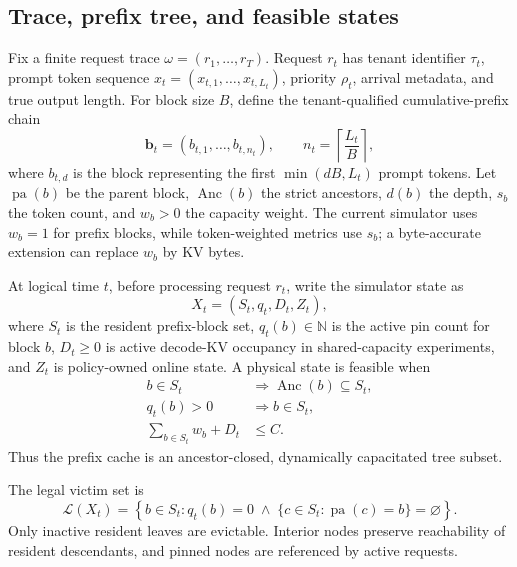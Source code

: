 \documentclass[11pt]{article}
\begin{document}
\subsection{Trace, prefix tree, and feasible states}

Fix a finite request trace \(\omega=(r_1,\ldots,r_T)\).  Request \(r_t\) has tenant
identifier \(\tau_t\), prompt token sequence
\(x_t=(x_{t,1},\ldots,x_{t,L_t})\), priority \(\rho_t\), arrival metadata, and true
output length.  For block size \(B\), define the tenant-qualified cumulative-prefix
chain
\begin{equation}
  \mathbf b_t=(b_{t,1},\ldots,b_{t,n_t}),
  \qquad
  n_t=\left\lceil \frac{L_t}{B}\right\rceil,
\end{equation}
where \(b_{t,d}\) is the block representing the first \(\min(dB,L_t)\) prompt tokens.
Let \(\operatorname{pa}(b)\) be the parent block, \(\operatorname{Anc}(b)\) the strict
ancestors, \(d(b)\) the depth, \(s_b\) the token count, and \(w_b>0\) the capacity
weight.  The current simulator uses \(w_b=1\) for prefix blocks, while token-weighted
metrics use \(s_b\); a byte-accurate extension can replace \(w_b\) by KV bytes.

At logical time \(t\), before processing request \(r_t\), write the simulator state as
\begin{equation}
  X_t=(S_t,q_t,D_t,Z_t),
\end{equation}
where \(S_t\) is the resident prefix-block set, \(q_t(b)\in\mathbb N\) is the active
pin count for block \(b\), \(D_t\ge 0\) is active decode-KV occupancy in shared-capacity
experiments, and \(Z_t\) is policy-owned online state.  A physical state is feasible
when
\begin{align}
  b\in S_t &\Longrightarrow \operatorname{Anc}(b)\subseteq S_t,
  \label{eq:prefix-closure-regime}\\
  q_t(b)>0 &\Longrightarrow b\in S_t,
  \label{eq:pins-resident-regime}\\
  \sum_{b\in S_t} w_b + D_t &\le C.
  \label{eq:capacity-regime}
\end{align}
Thus the prefix cache is an ancestor-closed, dynamically capacitated tree subset.

The legal victim set is
\begin{equation}
  \mathcal L(X_t)=
  \left\{b\in S_t:
  q_t(b)=0\;\land\;
  \{c\in S_t:\operatorname{pa}(c)=b\}=\varnothing
  \right\}.
  \label{eq:legal-victims-regime}
\end{equation}
Only inactive resident leaves are evictable.  Interior nodes preserve reachability of
resident descendants, and pinned nodes are referenced by active requests.
\end{document}
